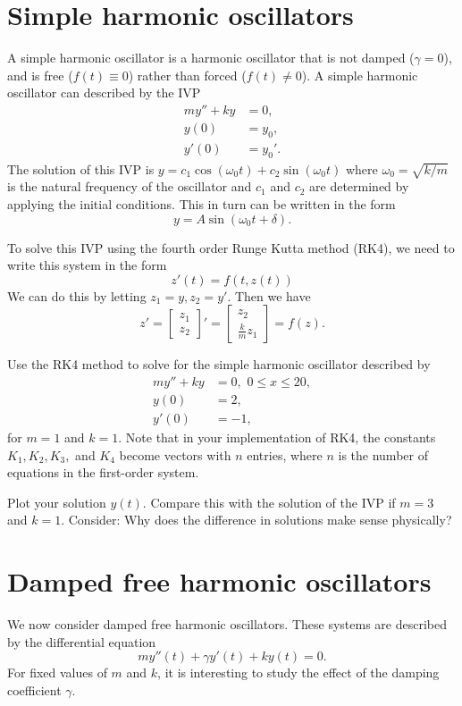 \section*{Simple harmonic oscillators}
A simple harmonic oscillator is a harmonic oscillator that is not damped ($\gamma =0$), and is free ($f(t) \equiv 0$) rather than forced ($f(t) \not = 0$). A simple harmonic oscillator can described by the IVP
\begin{align*}
my'' + ky &= 0,\\
y(0) &= y_0,\\
y'(0) &= y_0'.
\end{align*} 
The solution of this IVP is $y = c_1\cos (\omega_0 t) + c_2 \sin (\omega_0 t)$ where $\omega_0 = \sqrt{k/m}$ is the natural frequency of the oscillator and $c_1$ and $c_2$ are determined by applying the initial conditions. This in turn can be written in the form 
\[y = A\sin (\omega_0 t + \delta) .\]

To solve this IVP using the fourth order Runge Kutta method (RK4), we need to write this system in the form 
\[z'(t) = f(t,z(t)) \]
We can do this by letting $z_1 = y, z_2 = y'$. Then we have \[     z'= 
 \left[\begin{array}{c}z_1 \\z_2\end{array}\right]'  =  \left[\begin{array}{c}z_2 \\\frac{k}{m}z_1\end{array}\right]= f(z).\]


\begin{problem} Use the RK4 method to solve for the simple harmonic oscillator 
described by 
\begin{align*}
my'' + ky &= 0,\,\, 0 \leq x \leq 20, \\
y(0) &= 2, \\
y'(0) &= -1,
\end{align*} 
for $m = 1$ and $k =1$. Note that in your implementation of RK4, the constants $K_1, K_2, K_3,$ and $K_4$ become vectors with $n$ entries, where $n$ is the number of equations in the first-order system. 

Plot your solution $y(t)$.  Compare this with the solution of the IVP if  $m = 3$ and $k =1$. Consider: Why does the difference in solutions make sense physically?
\end{problem}


\section*{Damped free harmonic oscillators} We now consider damped free harmonic oscillators. These systems are described by the differential equation
\[my''(t) +\gamma y'(t) + ky(t) = 0.\]
For fixed values of $m$ and $k$, it is interesting to study the effect of the damping coefficient $\gamma$. 


